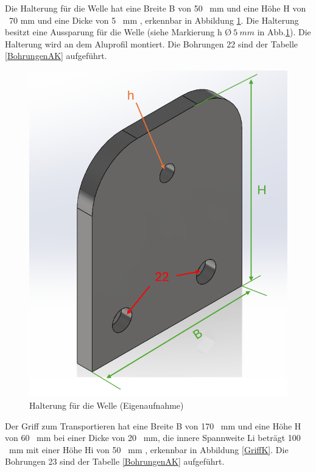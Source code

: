 Die Halterung für die Welle hat eine Breite B von 50 \ mm und eine Höhe H von \ 70 mm und eine Dicke von 5 \ mm , erkennbar in Abbildung \ref{FlankeK}. Die Halterung besitzt eine Aussparung für die Welle (siehe Markierung h \O $ \ 5 \ mm$ in Abb.\ref{FlankeK}). Die Halterung wird an dem Aluprofil montiert. Die Bohrungen 22 sind der Tabelle \ref{BohrungenAK} aufgeführt.  
 
	\begin{figure}[H]
		\begin{center}
			\includegraphics[width=\textwidth]{Images/Konstruktion/FlankeK.png}
			\caption{Halterung für die Welle (Eigenaufnahme)} \label{FlankeK}
		\end{center}
	\end{figure} 
	 
Der Griff zum Transportieren hat eine Breite B von 170 \ mm und eine Höhe H von 60 \ mm bei einer Dicke von 20 \ mm, die innere Spannweite Li beträgt 100 \ mm mit einer Höhe Hi von  50 \ mm , erkennbar in Abbildung \ref{GriffK}. Die Bohrungen 23 sind der Tabelle \ref{BohrungenAK} aufgeführt.  

